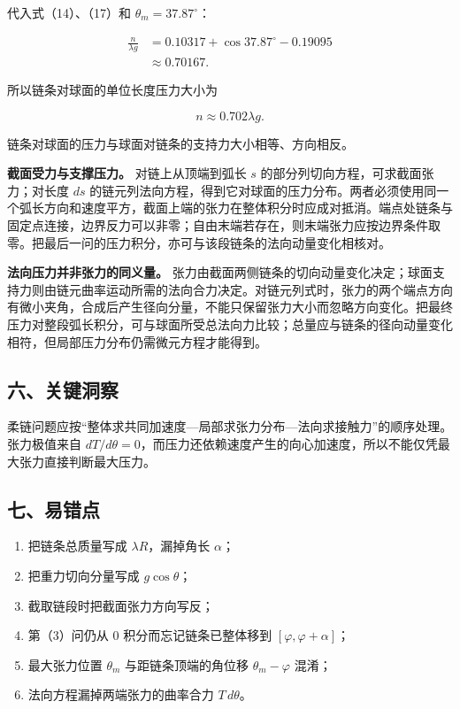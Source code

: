 \documentclass[12pt,a4paper,UTF8]{ctexart}
\newcommand{\tightlist}{\setlength{\itemsep}{0pt}\setlength{\parskip}{0pt}}
\begin{document}
代入式（14）、（17）和 \(\theta_m=37.87^\circ\)：

\[
\begin{aligned}
\frac{n}{\lambda g}
&=0.10317+\cos37.87^\circ-0.19095\\
&\approx0.70167.
\end{aligned}
\]

所以链条对球面的单位长度压力大小为

\[
\boxed{n\approx0.702\lambda g}.
\tag{19}
\]

链条对球面的压力与球面对链条的支持力大小相等、方向相反。

\textbf{截面受力与支撑压力。} 对链上从顶端到弧长 \(s\)
的部分列切向方程，可求截面张力；对长度 \(ds\)
的链元列法向方程，得到它对球面的压力分布。两者必须使用同一个弧长方向和速度平方，截面上端的张力在整体积分时应成对抵消。端点处链条与固定点连接，边界反力可以非零；自由末端若存在，则末端张力应按边界条件取零。把最后一问的压力积分，亦可与该段链条的法向动量变化相核对。

\textbf{法向压力并非张力的同义量。}
张力由截面两侧链条的切向动量变化决定；球面支持力则由链元曲率运动所需的法向合力决定。对链元列式时，张力的两个端点方向有微小夹角，合成后产生径向分量，不能只保留张力大小而忽略方向变化。把最终压力对整段弧长积分，可与球面所受总法向力比较；总量应与链条的径向动量变化相符，但局部压力分布仍需微元方程才能得到。

\subsection{六、关键洞察}\label{ux516dux5173ux952eux6d1eux5bdf-6}

柔链问题应按``整体求共同加速度---局部求张力分布---法向求接触力''的顺序处理。张力极值来自
\(dT/d\theta=0\)，而压力还依赖速度产生的向心加速度，所以不能仅凭最大张力直接判断最大压力。

\subsection{七、易错点}\label{ux4e03ux6613ux9519ux70b9-6}

\begin{enumerate}
\def\labelenumi{\arabic{enumi}.}
\tightlist
\item
  把链条总质量写成 \(\lambda R\)，漏掉角长 \(\alpha\)；
\item
  把重力切向分量写成 \(g\cos\theta\)；
\item
  截取链段时把截面张力方向写反；
\item
  第（3）问仍从 \(0\) 积分而忘记链条已整体移到
  \([\varphi,\varphi+\alpha]\)；
\item
  最大张力位置 \(\theta_m\) 与距链条顶端的角位移 \(\theta_m-\varphi\)
  混淆；
\item
  法向方程漏掉两端张力的曲率合力 \(T\,d\theta\)。
\end{enumerate}
\end{document}
